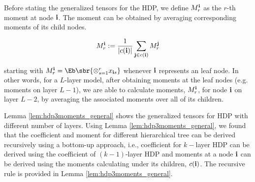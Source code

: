 \documentclass[twoside,11pt]{article}
\newcommand{\ib}{{\bf i}}
\newcommand{\jb}{{\bf j}}
\begin{document}
{\begin{description*}
\end{description*}

\noindent Before stating the generalized tensors for the HDP, we define $M_r^{\ib}$ as the $r$-th moment at node $\ib$. The moment can be obtained by averaging corresponding moments of its child nodes.

\begin{align}
\label{eq:mi-general}
M_r^{\ib} := \frac{1}{|c(\ib)|} \sum \limits_{\jb \in c(\ib)} M_r^{\jb}
\end{align}

starting with $M_r^{\ib} = \Eb \sbr{\otimes_{s=1}^r x_{\ib s}} $ whenever $\ib$ represents an leaf node. In other words, for a $L$-layer model, after obtaining moments at the leaf nodes (e.g. moments on layer $L-1$), we are able to calculate moments, $M_r^{\ib}$, for node $\ib$ on layer $L-2$, by averaging the associated moments over all of its children.

Lemma \ref{lem:hdp3moments_general} shows the generalized tensors for HDP with different number of layers. Using Lemma \ref{lem:hdp3moments_general}, we found that the coefficient and moment for different hierarchical tree can be derived recursively using a bottom-up approach, i.e., coefficient for $k-$layer HDP can be derived using the coefficient of $(k-1)$-layer HDP and moments at a node $\ib$ can be derived using the moments calculating under its children, $c(\ib)$. The recursive rule is provided in Lemma \ref{lem:hdp3moments_general}.

}
\end{document}
